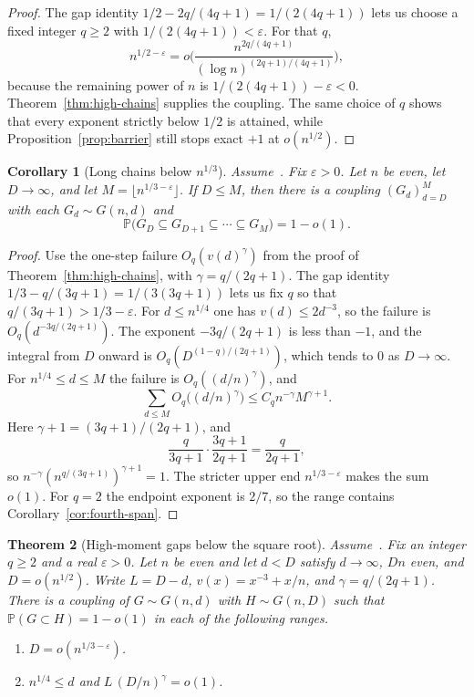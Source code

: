 \documentclass[11pt]{article}
\newtheorem{theorem}{Theorem}
\newtheorem{corollary}[theorem]{Corollary}
\newcommand{\PP}{\mathbb{P}}
\begin{document}
\begin{proof}
The gap identity \(1/2-2q/(4q+1)=1/(2(4q+1))\) lets us choose a fixed integer
\(q\ge 2\) with \(1/(2(4q+1))<\varepsilon\). For that \(q\),
\[
n^{1/2-\varepsilon}
=
o\Biggl(
\frac{n^{2q/(4q+1)}}{(\log n)^{(2q+1)/(4q+1)}}
\Biggr),
\]
because the remaining power of \(n\) is \(1/(2(4q+1))-\varepsilon<0\).
Theorem~\ref{thm:high-chains} supplies the coupling. The same choice of \(q\)
shows that every exponent strictly below \(1/2\) is attained, while
Proposition~\ref{prop:barrier} still stops exact \(+1\) at \(o(n^{1/2})\).
\end{proof}

\begin{corollary}[Long chains below \(n^{1/3}\)]
\label{cor:high-span}
Assume~\cite[Theorem~6]{Gao20}. Fix \(\varepsilon>0\). Let \(n\) be even, let
\(D\to\infty\), and let \(M=\lfloor n^{1/3-\varepsilon}\rfloor\). If \(D\le M\),
then there is a coupling \((G_d)_{d=D}^{M}\) with each \(G_d\sim G(n,d)\) and
\[
\PP\bigl(G_D\subseteq G_{D+1}\subseteq\cdots\subseteq G_M\bigr)=1-o(1).
\]
\end{corollary}

\begin{proof}
Use the one-step failure \(O_q(v(d)^\gamma)\) from the proof of
Theorem~\ref{thm:high-chains}, with \(\gamma=q/(2q+1)\). The gap identity
\(1/3-q/(3q+1)=1/(3(3q+1))\) lets us fix \(q\) so that
\(q/(3q+1)>1/3-\varepsilon\). For \(d\le n^{1/4}\) one has
\(v(d)\le 2d^{-3}\), so the failure is \(O_q(d^{-3q/(2q+1)})\). The exponent
\(-3q/(2q+1)\) is less than \(-1\), and the integral from \(D\) onward is
\(O_q(D^{(1-q)/(2q+1)})\), which tends to \(0\) as \(D\to\infty\).
For \(n^{1/4}\le d\le M\) the failure is \(O_q((d/n)^\gamma)\), and
\[
\sum_{d\le M}O_q\bigl((d/n)^\gamma\bigr)
\le
C_q n^{-\gamma}M^{\gamma+1}.
\]
Here \(\gamma+1=(3q+1)/(2q+1)\), and
\[
\frac{q}{3q+1}\cdot\frac{3q+1}{2q+1}
=
\frac{q}{2q+1},
\]
so \(n^{-\gamma}(n^{q/(3q+1)})^{\gamma+1}=1\). The stricter upper end
\(n^{1/3-\varepsilon}\) makes the sum \(o(1)\). For \(q=2\) the endpoint exponent
is \(2/7\), so the range contains Corollary~\ref{cor:fourth-span}.
\end{proof}

\begin{theorem}[High-moment gaps below the square root]
\label{thm:high-gap}
Assume~\cite[Theorem~6]{Gao20}. Fix an integer \(q\ge 2\) and a real \(\varepsilon>0\).
Let \(n\) be even and let \(d<D\) satisfy \(d\to\infty\), \(Dn\) even, and \(D=o(n^{1/2})\).
Write \(L=D-d\), \(v(x)=x^{-3}+x/n\), and \(\gamma=q/(2q+1)\).
There is a coupling of \(G\sim G(n,d)\) with \(H\sim G(n,D)\) such that
\(\PP(G\subset H)=1-o(1)\) in each of the following ranges.
\begin{enumerate}
\item \(D=o(n^{1/3-\varepsilon})\).
\item \(n^{1/4}\le d\) and \(L\,(D/n)^\gamma=o(1)\).
\end{enumerate}
\end{theorem}
\end{document}
